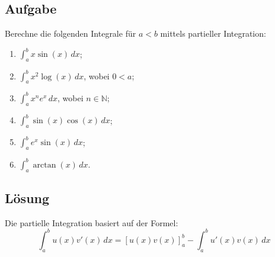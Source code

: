 \documentclass{article}
\begin{document}
\subsection*{Aufgabe}
Berechne die folgenden Integrale für $a<b$ mittels partieller Integration:

\begin{enumerate}
\item $\int_a^b x\sin(x)\,dx$;
\item $\int_a^b x^2\log(x)\,dx$, wobei $0<a$;
\item $\int_a^b x^n e^x\,dx$, wobei $n\in\mathbb{N}$;
\item $\int_a^b \sin(x)\cos(x)\,dx$;
\item $\int_a^b e^x\sin(x)\,dx$;
\item $\int_a^b \arctan(x)\,dx$.
\end{enumerate}

\subsection*{Lösung}

Die partielle Integration basiert auf der Formel:
$$\int_a^b u(x)v'(x)\,dx = [u(x)v(x)]_a^b - \int_a^b u'(x)v(x)\,dx$$
\end{document}
